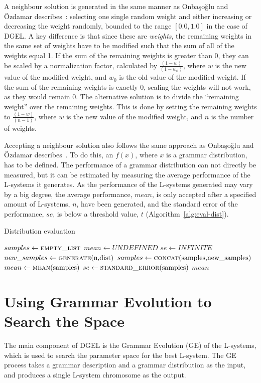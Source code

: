 A neighbour solution is generated in the same manner as Onbaşoğlu and Özdamar describes~\cite{2001Onbasoglu}: selecting one single random weight and either increasing or decreasing the weight randomly, bounded to the range $[0.0, 1.0]$ in the case of DGEL.
A key difference is that since these are \textit{weights}, the remaining weights in the same set of weights have to be modified such that the sum of all of the weights equal 1.
If the sum of the remaining weights is greater than 0, they can be scaled by a normalization factor, calculated by $\frac{(1 - w)}{(1 - w_0)}$, where $w$ is the new value of the modified weight, and $w_0$ is the old value of the modified weight.
If the sum of the remaining weights is exactly 0, scaling the weights will not work, as they would remain 0.
The alternative solution is to divide the ``remaining weight'' over the remaining weights.
This is done by setting the remaining weights to $\frac{(1 - w)}{(n - 1)}$, where $w$ is the new value of the modified weight, and $n$ is the number of weights.

Accepting a neighbour solution also follows the same approach as Onbaşoğlu and Özdamar describes~\cite{2001Onbasoglu}.
To do this, an $f(x)$, where $x$ is a grammar distribution, has to be defined.
The performance of a grammar distribution can not directly be measured, but it can be estimated by measuring the average performance of the L-systems it generates.
As the performance of the L-systems generated may vary by a big degree, the average performance, $mean$, is only accepted after a specified amount of L-systems, $n$, have been generated, and the standard error of the performance, $se$, is below a threshold value, $t$ (Algorithm~\ref{alg:eval-dist}).

\begin{algorithm}
\caption{Distribution evaluation}
\label{alg:eval-dist}
\begin{algorithmic}
    \State $samples\gets \Call{empty\_list}{}$
    \State $mean\gets UNDEFINED$
    \State $se\gets INFINITE$
        \State $new\_samples\gets \Call{generate}{$n$, $dist$}$
        \State $samples\gets \Call{concat}{$samples$, $new\_samples$}$
        \State $mean\gets \Call{mean}{$samples$}$
        \State $se\gets \Call{standard\_error}{$samples$}$
    \EndWhile
    \State \Return $mean$
\EndFunction
\end{algorithmic}
\end{algorithm}

\section{Using Grammar Evolution to Search the Space}
The main component of DGEL is the Grammar Evolution (GE) of the L-systems, which is used to search the parameter space for the best L-system.
The GE process takes a grammar description and a grammar distribution as the input, and produces a single L-system chromosome as the output.

